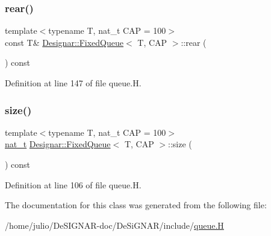 \subsubsection{\texorpdfstring{rear()}{rear()}\hspace{0.1cm}{\footnotesize\ttfamily [2/2]}}
{\footnotesize\ttfamily template$<$typename T, nat\+\_\+t C\+AP = 100$>$ \\
const T\& \hyperlink{class_designar_1_1_fixed_queue}{Designar\+::\+Fixed\+Queue}$<$ T, C\+AP $>$\+::rear (\begin{DoxyParamCaption}{ }\end{DoxyParamCaption}) const\hspace{0.3cm}{\ttfamily [inline]}}



Definition at line 147 of file queue.\+H.

\mbox{\label{class_designar_1_1_fixed_queue_a9fa2f855edd54de0c847c8ba35c804cf}} 
\subsubsection{\texorpdfstring{size()}{size()}}
{\footnotesize\ttfamily template$<$typename T, nat\+\_\+t C\+AP = 100$>$ \\
\hyperlink{namespace_designar_aa72662848b9f4815e7bf31a7cf3e33d1}{nat\+\_\+t} \hyperlink{class_designar_1_1_fixed_queue}{Designar\+::\+Fixed\+Queue}$<$ T, C\+AP $>$\+::size (\begin{DoxyParamCaption}{ }\end{DoxyParamCaption}) const\hspace{0.3cm}{\ttfamily [inline]}}



Definition at line 106 of file queue.\+H.



The documentation for this class was generated from the following file\+:\begin{DoxyCompactItemize}
\item 
/home/julio/\+De\+S\+I\+G\+N\+A\+R-\/doc/\+De\+Si\+G\+N\+A\+R/include/\hyperlink{queue_8_h}{queue.\+H}\end{DoxyCompactItemize}
